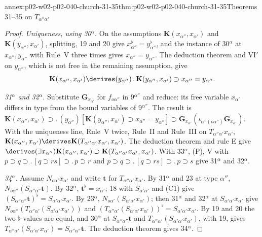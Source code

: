 \begin{annexitem}{annex:p02-w02-p02-040-church-31-35}{thm:p02-w02-p02-040-church-31-35}{Theorems 31--35 on \(T_{\alpha''\alpha'}\)}
\begin{proof}
\emph{Uniqueness, using 30\(^\alpha\).}  On the assumptions
\(\mathbf K(x_{\alpha''},x_{\alpha'})\) and \(\mathbf K(y_{\alpha''},x_{\alpha'})\),
splitting, 19 and 20 give \(x_{\alpha''}^\flat=y_{\alpha''}^\flat\), and the
instance of 30\(^\alpha\) at \(x_{\alpha''},y_{\alpha''}\) with Rule~V three times
gives \(x_{\alpha''}=y_{\alpha''}\).  The deduction theorem and VI\('\) on
\(y_{\alpha''}\), which is not free in the remaining assumption, give
\[
 \mathbf K(x_{\alpha''},x_{\alpha'})\derives(y_{\alpha''})\,.\,
 \mathbf K(y_{\alpha''},x_{\alpha'})\supset x_{\alpha''}=y_{\alpha''}.
\]

\emph{31\(^\alpha\) and 32\(^\alpha\).}  Substitute \(\mathbf G_{x_{\alpha'}}\) for
\(f_{o\alpha''}\) in 9\(^{\alpha''}\) and reduce: its free variable
\(x_{\alpha'}\) differs in type from the bound variables of 9\(^{\alpha''}\).
The result is
\(\mathbf K(x_{\alpha''},x_{\alpha'})\supset.\,(y_{\alpha''})[\mathbf K(y_{\alpha''},x_{\alpha'})\supset x_{\alpha''}=y_{\alpha''}]\supset
\mathbf G_{x_{\alpha'}}(\iota_{\alpha''(o\alpha'')}\mathbf G_{x_{\alpha'}})\).
With the uniqueness line, Rule~V twice, Rule~II and Rule~III on
\(T_{\alpha''\alpha'}x_{\alpha'}\),
\(\mathbf K(x_{\alpha''},x_{\alpha'})\derives\mathbf K(T_{\alpha''\alpha'}x_{\alpha'},x_{\alpha'})\).
The deduction theorem and rule E give
\(\derives(\exists x_{\alpha''})\mathbf K(x_{\alpha''},x_{\alpha'})\supset\mathbf K(T_{\alpha''\alpha'}x_{\alpha'},x_{\alpha'})\).
With 33\(^\alpha\), (P), V with
\(p\supset q\supset.\,[q\supset rs]\supset.\,p\supset r\) and
\(p\supset q\supset.\,[q\supset rs]\supset.\,p\supset s\) give 31\(^\alpha\) and
32\(^\alpha\).

\emph{34\(^\alpha\).}  Assume \(N_{o\alpha'}x_{\alpha'}\) and write \(\mathbf t\) for
\(T_{\alpha''\alpha'}x_{\alpha'}\).  By 31\(^\alpha\) and 23 at type \(\alpha''\),
\(N_{o\alpha''}(S_{\alpha''\alpha''}\mathbf t)\).  By 32\(^\alpha\),
\(\mathbf t^\flat=x_{\alpha'}\); 18 with \(S_{\alpha'\alpha'}\) and (C1) give
\((S_{\alpha''\alpha''}\mathbf t)^\flat=S_{\alpha'\alpha'}x_{\alpha'}\).  By
23\(^\alpha\), \(N_{o\alpha'}(S_{\alpha'\alpha'}x_{\alpha'})\); then 31\(^\alpha\)
and 32\(^\alpha\) at \(S_{\alpha'\alpha'}x_{\alpha'}\) give
\(N_{o\alpha''}(T_{\alpha''\alpha'}(S_{\alpha'\alpha'}x_{\alpha'}))\) and
\((T_{\alpha''\alpha'}(S_{\alpha'\alpha'}x_{\alpha'}))^\flat=S_{\alpha'\alpha'}x_{\alpha'}\).
By 19 and 20 the two \(\flat\)-values are equal, and 30\(^\alpha\) at
\(S_{\alpha''\alpha''}\mathbf t\) and \(T_{\alpha''\alpha'}(S_{\alpha'\alpha'}x_{\alpha'})\),
with 19, gives
\(T_{\alpha''\alpha'}(S_{\alpha'\alpha'}x_{\alpha'})=S_{\alpha''\alpha''}\mathbf t\).
The deduction theorem gives 34\(^\alpha\).


\end{proof}
\end{annexitem}
